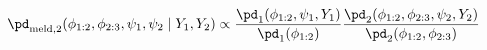 \begin{equation}
  \pd_{\text{meld}, 2} (\phi_{1:2}, \phi_{2:3}, \psi_{1}, \psi_{2} \mid Y_{1}, Y_{2}) \propto
  \frac {
    \pd_{1}(\phi_{1:2}, \psi_{1}, Y_{1})
  } {
    \pd_{1}(\phi_{1:2})
  }
  \frac {
    \pd_{2} (\phi_{1:2}, \phi_{2:3}, \psi_{2}, Y_{2})
  } {
    \pd_{2}(\phi_{1:2}, \phi_{2:3})
  }
  \label{eqn:stage-two-target}
\end{equation}